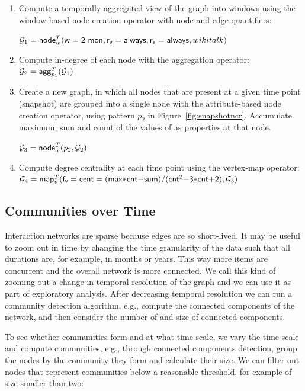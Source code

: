 \begin{enumerate}[itemindent=\dimexpr\labelwidth+\labelsep\relax,leftmargin=0pt]
\item Compute a temporally aggregated view of the graph into windows
  using the window-based node creation operator with 
  node and edge quantifiers:

$\mathcal{G}_1 = \textsf{node}^T_w(\mathsf{w=2~mon},\mathsf{r_v=always},\mathsf{r_e=always},wikitalk)$

\item Compute in-degree of each node with the aggregation operator:  $\mathcal{G}_2 = \textsf{agg}^T_{p_1}(\mathcal{G}_1)$

\item Create a new graph, in which all nodes that are present at a
  given time point (snapshot) are grouped into a single node with the
  attribute-based node creation operator, using pattern $p_2$ in
  Figure~\ref{fig:snapshotncr}.  Accumulate maximum, sum and count of the
  values of  as properties at that node.

$\mathcal{G}_3 =\textsf{node}^T_a(p_2,\mathcal{G}_2)$

%

\item Compute degree centrality at each time point using the vertex-map operator:  $\medmuskip=0mu\ttt_4 = \vmap{\mathsf{f_v=cent=(max*cnt-sum)/(cnt^2-3*cnt+2)}, \ttt_3}$
\end{enumerate}

\subsection{Communities over Time} 

Interaction networks are sparse because edges are so short-lived.  It
may be useful to zoom out in time by changing the time granularity of
the data such that all durations are, for example, in months or years.
This way more items are concurrent and the overall network is more
connected.  We call this kind of zooming out a change in temporal
resolution of the graph and we can use it as part of exploratory
analysis.  After decreasing temporal resolution we can run a community
detection algorithm, e.g., compute the connected components of the
network, and then consider the number of and size of connected
components.  

To see whether communities form and at what time scale, we vary the
time scale and compute communities, e.g., through connected components
detection, group the nodes by the community they form and calculate
their size.  We can filter out nodes that represent communities
below a reasonable threshold, for example of size smaller than two:

